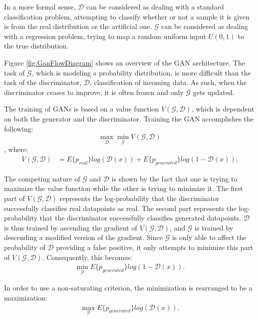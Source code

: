 	\par In a more formal sense, $\mathcal{D}$ can be considered as dealing with a standard classification problem, attempting to classify whether or not a sample it is given is from the real distribution or the artificial one. $\mathcal{G}$ can be considered as dealing with a regression problem, trying to map a random uniform input $U(0,1)$ to the true distribution. 
	\par Figure \ref{fig:GanFlowDiagram} shows an overview of the GAN architecture. The task of $\mathcal{G}$, which is modeling a probability distribution, is more difficult than the task of the discriminator, $\mathcal{D}$, classification of incoming data. As such, when the discriminator ceases to improve, it is often frozen and only $\mathcal{G}$ gets updated. 
	\par The training of GANs is based on a value function $V(\mathcal{G},\mathcal{D})$, which is dependent on both the generator and the discriminator. Training the GAN accomplishes the following: 
	\[ \max_\mathcal{D}\min_\mathcal{G} V(\mathcal{G},\mathcal{D}) \], where:
	\begin{align}
		V(\mathcal{G},\mathcal{D}) &= E\{p_{real}\}log(\mathcal{D}(x)) + E\{p_{generated}\} log(1-\mathcal{D}(x)).
	\end{align}
	\par The competing nature of $\mathcal{G}$ and $\mathcal{D}$ is shown by the fact that one is trying to maximize the value function while the other is trying to minimize it. The first part of $V(\mathcal{G},\mathcal{D})$ represents the log-probability that the discriminator successfully classifies real datapoints as real. The second part represents the log-probability that the discriminator successfully classifies generated datapoints. $\mathcal{D}$ is thus trained by ascending the gradient of $V(\mathcal{G},\mathcal{D})$, and $\mathcal{G}$ is trained by descending a modified version of the gradient. Since $\mathcal{G}$ is only able to affect the probability of $\mathcal{D}$ providing a false positive, it only attempts to minimize this part of $V(\mathcal{G},\mathcal{D})$. Consequently, this becomes:
	\begin{align}
		\min_\mathcal{G} E\{p_{generated}\} log(1-\mathcal{D}(x)).
	\end{align}
	\par In order to use a non-saturating criterion, the minimization is rearranged to be a maximization:
	\begin{align}
		\max_\mathcal{G} E\{p_{generated}\} log(\mathcal{D}(x)). \label{eq:bg_nonsatG} 
	\end{align}
